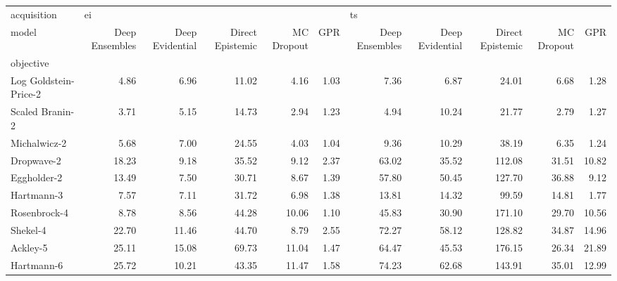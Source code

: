 \begin{tabular}{lrrrrrrrrrr}
\toprule
acquisition & \multicolumn{5}{l}{ei} & \multicolumn{5}{l}{ts} \\
model & Deep Ensembles & Deep Evidential & Direct Epistemic & MC Dropout &   GPR & Deep Ensembles & Deep Evidential & Direct Epistemic & MC Dropout &    GPR \\
objective             &                &                 &                  &            &       &                &                 &                  &            &        \\
\midrule
Log Goldstein-Price-2 &           4.86 &            6.96 &            11.02 &       4.16 &  1.03 &           7.36 &            6.87 &            24.01 &       6.68 &   1.28 \\
Scaled Branin-2       &           3.71 &            5.15 &            14.73 &       2.94 &  1.23 &           4.94 &           10.24 &            21.77 &       2.79 &   1.27 \\
Michalwicz-2          &           5.68 &            7.00 &            24.55 &       4.03 &  1.04 &           9.36 &           10.29 &            38.19 &       6.35 &   1.24 \\
Dropwave-2            &          18.23 &            9.18 &            35.52 &       9.12 &  2.37 &          63.02 &           35.52 &           112.08 &      31.51 &  10.82 \\
Eggholder-2           &          13.49 &            7.50 &            30.71 &       8.67 &  1.39 &          57.80 &           50.45 &           127.70 &      36.88 &   9.12 \\
Hartmann-3            &           7.57 &            7.11 &            31.72 &       6.98 &  1.38 &          13.81 &           14.32 &            99.59 &      14.81 &   1.77 \\
Rosenbrock-4          &           8.78 &            8.56 &            44.28 &      10.06 &  1.10 &          45.83 &           30.90 &           171.10 &      29.70 &  10.56 \\
Shekel-4              &          22.70 &           11.46 &            44.70 &       8.79 &  2.55 &          72.27 &           58.12 &           128.82 &      34.87 &  14.96 \\
Ackley-5              &          25.11 &           15.08 &            69.73 &      11.04 &  1.47 &          64.47 &           45.53 &           176.15 &      26.34 &  21.89 \\
Hartmann-6            &          25.72 &           10.21 &            43.35 &      11.47 &  1.58 &          74.23 &           62.68 &           143.91 &      35.01 &  12.99 \\
\bottomrule
\end{tabular}
